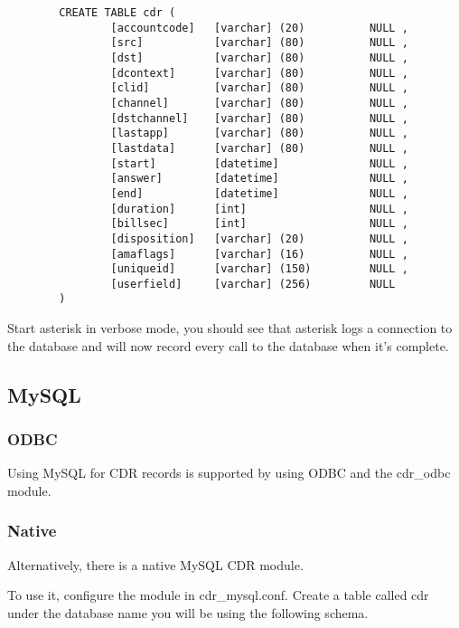 \begin{astlisting}
\begin{verbatim}
		CREATE TABLE cdr (
		        [accountcode]   [varchar] (20)          NULL ,
		        [src]           [varchar] (80)          NULL ,
		        [dst]           [varchar] (80)          NULL ,
		        [dcontext]      [varchar] (80)          NULL ,
		        [clid]          [varchar] (80)          NULL ,
		        [channel]       [varchar] (80)          NULL ,
		        [dstchannel]    [varchar] (80)          NULL ,
		        [lastapp]       [varchar] (80)          NULL ,
		        [lastdata]      [varchar] (80)          NULL ,
		        [start]         [datetime]              NULL ,
		        [answer]        [datetime]              NULL ,
		        [end]           [datetime]              NULL ,
		        [duration]      [int]                   NULL ,
		        [billsec]       [int]                   NULL ,
		        [disposition]   [varchar] (20)          NULL ,
		        [amaflags]      [varchar] (16)          NULL ,
		        [uniqueid]      [varchar] (150)         NULL ,
		        [userfield]     [varchar] (256)         NULL
		)
\end{verbatim}
\end{astlisting}
                Start asterisk in verbose mode, you should see that asterisk
                logs a connection to the database and will now record every
                call to the database when it's complete.


\subsection{MySQL}

\subsubsection{ODBC}

Using MySQL for CDR records is supported by using ODBC and the cdr_odbc module.

\subsubsection{Native}

Alternatively, there is a native MySQL CDR module.

To use it, configure the module in cdr_mysql.conf.  Create a table called cdr under the database name you will be using the following schema.

